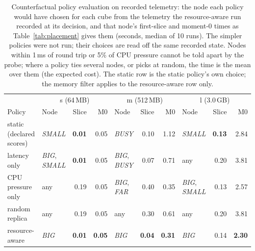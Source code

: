 \begin{table}
\centering
\caption{Counterfactual policy evaluation on recorded telemetry: the node each policy would have chosen for each cube from the telemetry the resource-aware run recorded at its decision, and that node's first-slice and moment-0 times as Table~\ref{tab:placement} gives them (seconds, median of 10 runs). The simpler policies were not run; their choices are read off the same recorded state. Nodes within 1\,ms of round trip or 5\% of CPU pressure cannot be told apart by the probe; where a policy ties several nodes, or picks at random, the time is the mean over them (the expected cost). The static row is the static policy's own choice; the memory filter applies to the resource-aware row only.}
\label{tab:baselines}
\small
\begin{tabular*}{\linewidth}{@{\extracolsep{\fill}}llrrlrrlrr}
\toprule
 & \multicolumn{3}{c}{s (64\,MB)} & \multicolumn{3}{c}{m (512\,MB)} & \multicolumn{3}{c}{l (3.0\,GB)} \\
Policy & Node & Slice & M0 & Node & Slice & M0 & Node & Slice & M0 \\
\midrule
static (declared scores) & \emph{SMALL} & \textbf{0.01} & 0.05 & \emph{BUSY} & 0.10 & 1.12 & \emph{SMALL} & \textbf{0.13} & 2.84 \\
latency only & \emph{BIG}, \emph{SMALL} & \textbf{0.01} & 0.05 & \emph{BIG}, \emph{BUSY} & 0.07 & 0.71 & any & 0.20 & 3.81 \\
CPU pressure only & any & 0.19 & 0.05 & \emph{BIG}, \emph{FAR} & 0.40 & 0.35 & \emph{BIG}, \emph{SMALL} & 0.13 & 2.57 \\
random replica & any & 0.19 & 0.05 & any & 0.30 & 0.61 & any & 0.20 & 3.81 \\
resource-aware & \emph{BIG} & \textbf{0.01} & \textbf{0.05} & \emph{BIG} & \textbf{0.04} & \textbf{0.31} & \emph{BIG} & 0.14 & \textbf{2.30} \\
\bottomrule
\end{tabular*}
\end{table}
